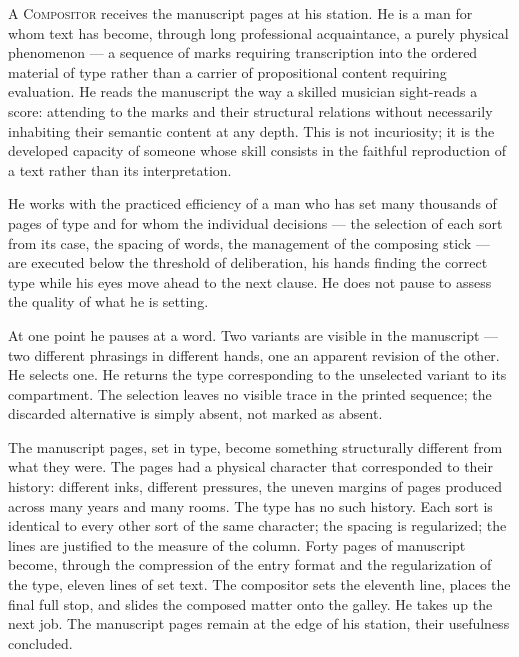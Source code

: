\documentclass[12pt, oneside]{article}
\newenvironment{action}{%
  \vspace{0.6em}%
  \noindent\ignorespaces%
}{%
  \par\vspace{0.6em}%
}
\begin{document}
\begin{action}
A \textsc{Compositor} receives the manuscript pages at his station. He is a man for whom text has become, through long professional acquaintance, a purely physical phenomenon --- a sequence of marks requiring transcription into the ordered material of type rather than a carrier of propositional content requiring evaluation. He reads the manuscript the way a skilled musician sight-reads a score: attending to the marks and their structural relations without necessarily inhabiting their semantic content at any depth. This is not incuriosity; it is the developed capacity of someone whose skill consists in the faithful reproduction of a text rather than its interpretation.

He works with the practiced efficiency of a man who has set many thousands of pages of type and for whom the individual decisions --- the selection of each sort from its case, the spacing of words, the management of the composing stick --- are executed below the threshold of deliberation, his hands finding the correct type while his eyes move ahead to the next clause. He does not pause to assess the quality of what he is setting.
\end{action}

\begin{action}
At one point he pauses at a word. Two variants are visible in the manuscript --- two different phrasings in different hands, one an apparent revision of the other. He selects one. He returns the type corresponding to the unselected variant to its compartment. The selection leaves no visible trace in the printed sequence; the discarded alternative is simply absent, not marked as absent.

The manuscript pages, set in type, become something structurally different from what they were. The pages had a physical character that corresponded to their history: different inks, different pressures, the uneven margins of pages produced across many years and many rooms. The type has no such history. Each sort is identical to every other sort of the same character; the spacing is regularized; the lines are justified to the measure of the column. Forty pages of manuscript become, through the compression of the entry format and the regularization of the type, eleven lines of set text. The compositor sets the eleventh line, places the final full stop, and slides the composed matter onto the galley. He takes up the next job. The manuscript pages remain at the edge of his station, their usefulness concluded.
\end{action}
\end{document}
